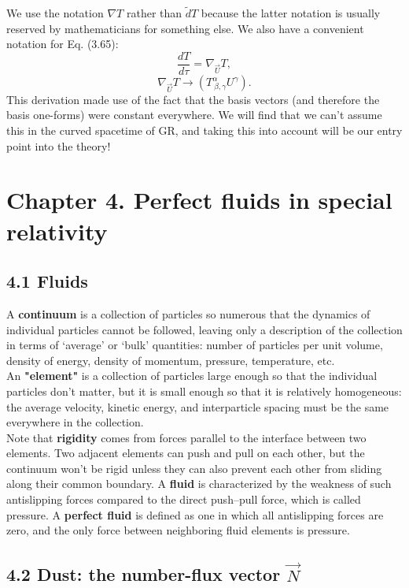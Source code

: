 \documentclass[12pt]{book}
\begin{document}
    We use the notation \(\nabla T\) rather than \(\tilde{d}T\) because the latter notation is usually reserved by mathematicians for something else. We also have a convenient notation for Eq. (3.65):
    \[
    \frac{dT}{d\tau} = \nabla_{\vec{U}} T, \tag{3.67}
    \]
    \[
    \nabla_{\vec{U}} T \rightarrow \left(T^\alpha_{\ \beta, \gamma} U^\gamma\right). \tag{3.68}
    \]
    This derivation made use of the fact that the basis vectors (and therefore the basis one-forms) were constant everywhere. We will find that we can’t assume this in the curved spacetime of GR, and taking this into account will be our entry point into the theory!
    
\section{Chapter 4. Perfect fluids in special relativity}

    \subsection{4.1 Fluids}
        A \textbf{continuum} is a collection of particles so numerous that the dynamics of individual particles cannot be followed, leaving only a description of the collection in terms of ‘average’ or ‘bulk’ quantities: number of particles per unit volume, density of energy, density of momentum, pressure, temperature, etc.\\
        An \textbf{"element"} is a collection of particles large enough so that the individual particles don’t matter, but it is small enough so that it is relatively homogeneous: the average velocity, kinetic energy, and interparticle spacing must be the same everywhere in the collection.\\
        Note that \textbf{rigidity} comes from forces parallel to the interface between two elements. Two adjacent elements can push and pull on each other, but the continuum won’t be rigid unless they can also prevent each other from sliding along their common boundary. A \textbf{fluid} is characterized by the weakness of such antislipping forces compared to the direct push–pull force, which is called pressure. A \textbf{perfect fluid} is defined as one in which all antislipping forces are zero, and the only force between neighboring fluid elements is pressure.

    \subsection{4.2 Dust: the number-flux vector $\vec{N}$}
    
\end{document}
